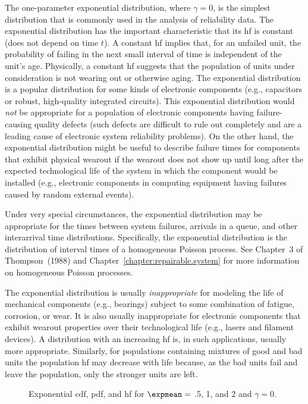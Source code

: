 The one-parameter exponential distribution, where $\gamma=0$, is the
simplest distribution that is commonly used in the analysis of
reliability data.  The exponential distribution has the important
characteristic that its hf is constant (does not depend
on time $t$). A constant hf implies that, for an unfailed unit,
the probability of failing in the next small interval of time is
independent of the unit's age. Physically, a constant hf suggests
that the population of units under consideration
is not wearing out or otherwise aging.  The exponential
distribution is a popular distribution for some kinds of electronic
components (e.g., capacitors or robust, high-quality integrated
circuits). This exponential distribution would {\em not} be
appropriate for a population of electronic components having
failure-causing quality defects (such defects are difficult to rule
out completely and are a leading cause of electronic system
reliability problems). On the other hand, the exponential distribution
might be useful to describe failure times for components that exhibit
physical wearout if the wearout does not show up until long after the
expected technological life of the system in which the component would
be installed (e.g., electronic components in computing equipment
having failures caused by random external events).

Under very special circumstances, the exponential distribution may be
appropriate for the times between system failures, arrivals
in a queue, and other interarrival time distributions. Specifically,
the exponential distribution is the distribution of interval times of
a homogeneous Poisson process. See Chapter~3 of Thompson~(1988)
and Chapter~\ref{chapter:repairable.system} 
for more information on homogeneous Poisson processes.

The exponential distribution is usually {\em inappropriate}
for modeling the life of mechanical components (e.g., bearings) subject
to some combination of fatigue, corrosion, or wear. It is also
usually inappropriate for  electronic
components that exhibit wearout properties over their technological
life (e.g., lasers and filament devices).  A distribution with an
increasing hf is, in such applications, usually more
appropriate.  Similarly, for populations containing mixtures of good
and bad units the population
hf may decrease with life because, as
the bad units fail and leave the population, only the stronger units
are left.
\begin{figure}
\caption{Exponential cdf, pdf, and hf
for $\expmean=$ .5, 1, and 2 and $\gamma=0$.}
\label{figure:distplot.exp.ps}
\end{figure}


